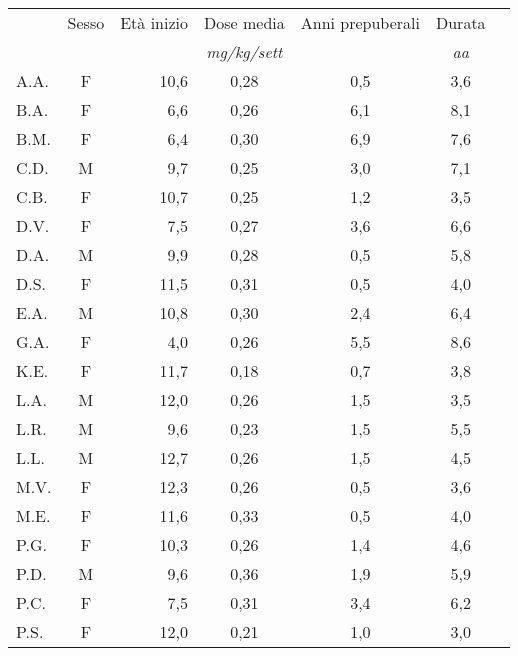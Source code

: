 \begin{table}[!h]
\begin{center}
\begin{tabular}{lcrcccl}
\toprule
 &      Sesso &   Età inizio  & Dose media 	& Anni prepuberali & Durata \\
 &     &				  	& \emph{mg/kg/sett}	& & \emph{aa} \\
\midrule                                  	
A.A.	& F & 10,6  	      &  0,28     	& 0,5                 & 3,6  \\
B.A.	& F & 6,6   	      &  0,26     	& 6,1                 & 8,1  \\
B.M.	& F & 6,4   	      &  0,30     	& 6,9                 & 7,6  \\
C.D.	& M & 9,7   	      &  0,25     	& 3,0                 & 7,1  \\
C.B.	& F & 10,7  	      &  0,25     	& 1,2             & 3,5  \\
D.V.	& F & 7,5   	      &  0,27     	& 3,6                 & 6,6  \\
D.A.	& M & 9,9   	      &  0,28     	& 0,5                 & 5,8  \\
D.S.	& F & 11,5  	      &  0,31     	& 0,5                 & 4,0  \\
E.A.	& M & 10,8  	      &  0,30     	& 2,4                 & 6,4  \\
G.A.	& F & 4,0   	      &  0,26     	& 5,5                 & 8,6  \\
K.E.	& F & 11,7        	  &  0,18       & 0,7              & 3,8  \\
L.A.	& M & 12,0  	      &  0,26     	& 1,5                 & 3,5  \\
L.R.	& M & 9,6   	      &  0,23     	& 1,5                 & 5,5  \\
L.L.	& M & 12,7  	      &  0,26     	& 1,5                 & 4,5  \\
M.V.	& F & 12,3  	      &  0,26     	& 0,5              & 3,6  \\
M.E.	& F & 11,6  	      &  0,33     	& 0,5             & 4,0  \\
P.G.	& F & 10,3  	      &  0,26     	& 1,4              & 4,6  \\
P.D.	& M & 9,6   	      &  0,36     	& 1,9                 & 5,9  \\
P.C.	& F & 7,5   	      &  0,31     	& 3,4                & 6,2  \\
P.S.	& F & 12,0  	      &  0,21     	& 1,0                 & 3,0  \\

\end{tabular}
\end{center}
\end{table}
